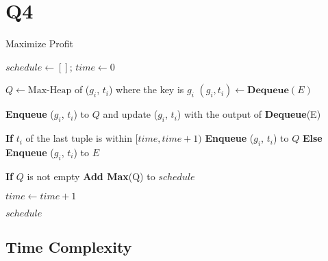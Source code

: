 \section*{Q4}


\begin{algorithm}[H]
    \caption{Maximize Profit}  
    \begin{algorithmic}[1]
    \vspace{1em}
    
     
        
        \vspace{1em}

        \State $schedule \gets [ ]$; $time \gets 0$
        \vspace{1em}

            \State $Q \gets \text{Max-Heap}$ of ($g_i$, $t_i$) where the key is $g_i$
            \State $(g_i, t_i) \gets \textbf{Dequeue}(E)$

            \vspace{1em}
                \State \textbf{Enqueue} ($g_i$, $t_i$) to $Q$ and update ($g_i$, $t_i$) with the output of \textbf{Dequeue}(E)
            \EndWhile
            
            \vspace{1em}
            \State \textbf{If} $t_i$ of the last tuple is within $[time, time + 1)$ \textbf{Enqueue} ($g_i$, $t_i$) to $Q$
            \State \textbf{Else} \textbf{Enqueue} ($g_i$, $t_i$) to $E$ 

            \vspace{1em}
            \State \textbf{If} $Q$ is not empty \textbf{Add Max}(Q) to $schedule$

            \State $time \gets time + 1$
        \vspace{1em}
        \EndWhile
        

        \vspace{1em}
        \State \Return $schedule$ 
        \EndFunction
    
    \vspace{1em}
    \end{algorithmic}
    \end{algorithm}
    

    \subsection*{Time Complexity}

